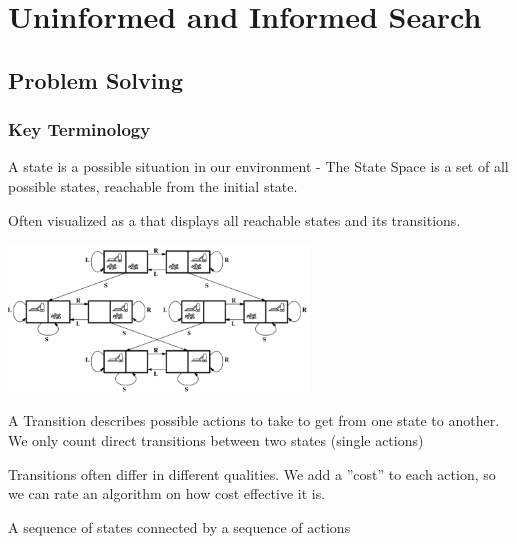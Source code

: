 \documentclass[
../../EiKI_Summary.tex,
]
{subfiles}
\begin{document}
\section{Uninformed and Informed Search}
\subsection{Problem Solving}
\subsubsection{Key Terminology}

\begin{defbox}
    A state is a possible situation in our environment - The State Space is a set of all possible states, reachable from the initial state. 
    
    Often visualized as a  that displays all reachable states and its transitions.

    \begin{center}
        \includegraphics[width=0.6\textwidth]{Pics/03/StateSpaceGraph.png}
    \end{center}
\end{defbox}

\begin{defbox}
    A Transition describes possible actions to take to get from one state to another. We only count direct transitions between two states (single actions)
\end{defbox}

\begin{defbox}
    [Costs]
    Transitions often differ in different qualities. We add a ''cost'' to each action, so we can rate an algorithm on how cost effective it is. 
\end{defbox}

\begin{defbox}
    [Path]
    A sequence of states connected by a sequence of actions
\end{defbox}
\end{document}
